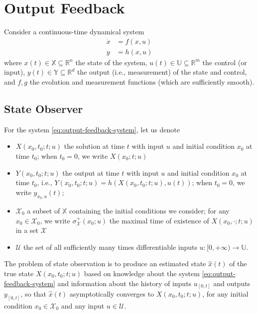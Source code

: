 \documentclass[
]{book}
\theoremstyle{definition}
\theoremstyle{definition}
\theoremstyle{definition}
\theoremstyle{definition}
\theoremstyle{remark}
\begin{document}
\hypertarget{output-feedback}{%
\chapter{Output Feedback}\label{output-feedback}}

Consider a continuous-time dynamical system
\begin{equation}
\begin{split}
\dot{x} &= f(x,u)  \\
y &= h(x,u)
\end{split} 
\label{eq:output-feedback-system}
\end{equation}
where \(x(t) \in \mathbb{X} \subseteq \mathbb{R}^n\) the state of the system, \(u(t) \in \mathbb{U} \subseteq \mathbb{R}^m\) the control (or input), \(y(t) \in \mathbb{Y} \subseteq \mathbb{R}^{d}\) the output (i.e., measurement) of the state and control, and \(f,g\) the evolution and measurement functions (which are sufficiently smooth).

\hypertarget{state-observer}{%
\section{State Observer}\label{state-observer}}

For the system \eqref{eq:output-feedback-system}, let us denote

\begin{itemize}
\item
  \(X(x_0,t_0;t;u)\) the solution at time \(t\) with input \(u\) and initial condition \(x_0\) at time \(t_0\); when \(t_0 = 0\), we write \(X(x_0;t;u)\)
\item
  \(Y(x_0,t_0;t;u)\) the output at time \(t\) with input \(u\) and initial condition \(x_0\) at time \(t_0\), i.e., \(Y(x_0,t_0;t;u) = h(X(x_0,t_0;t;u), u(t))\); when \(t_0 = 0\), we write \(y_{x_0,u}(t)\);
\item
  \(\mathcal{X}_0\) a subset of \(\mathbb{X}\) containing the initial conditions we consider; for any \(x_0 \in \mathcal{X}_0\), we write \(\sigma^+_{\mathcal{X}}(x_0;u)\) the maximal time of existence of \(X(x_0,\cdot;t;u)\) in a set \(\mathcal{X}\)
\item
  \(\mathcal{U}\) the set of all sufficiently many times differentiable inputs \(u: [0,+\infty) \rightarrow \mathbb{U}\).
\end{itemize}

The problem of state observation is to produce an estimated state \(\hat{x}(t)\) of the true state \(X(x_0,t_0;t;u)\) based on knowledge about the system \eqref{eq:output-feedback-system} and information about the history of inputs \(u_{[0,t]}\) and outputs \(y_{[0,t]}\), so that \(\hat{x}(t)\) asymptotically converges to \(X(x_0,t_0;t;u)\), for any initial condition \(x_0 \in \mathcal{X}_0\) and any input \(u \in \mathcal{U}\).
\end{document}
